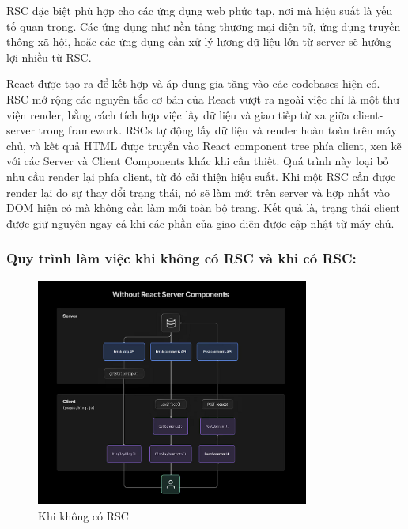 RSC đặc biệt phù hợp cho các ứng dụng web phức tạp, nơi mà hiệu suất là yếu tố quan trọng. Các ứng dụng như nền tảng thương mại điện tử, ứng dụng truyền thông xã hội, hoặc các ứng dụng cần xử lý lượng dữ liệu lớn từ server sẽ hưởng lợi nhiều từ RSC.

React được tạo ra để kết hợp và áp dụng gia tăng vào các codebases hiện có. RSC mở rộng các nguyên tắc cơ bản của React vượt ra ngoài việc chỉ là một thư viện render, bằng cách tích hợp việc lấy dữ liệu và giao tiếp từ xa giữa client-server trong framework. RSCs tự động lấy dữ liệu và render hoàn toàn trên máy chủ, và kết quả HTML được truyền vào React component tree phía client, xen kẽ với các Server và Client Components khác khi cần thiết. Quá trình này loại bỏ nhu cầu render lại phía client, từ đó cải thiện hiệu suất. Khi một RSC cần được render lại do sự thay đổi trạng thái, nó sẽ làm mới trên server và hợp nhất vào DOM hiện có mà không cần làm mới toàn bộ trang. Kết quả là, trạng thái client được giữ nguyên ngay cả khi các phần của giao diện được cập nhật từ máy chủ.

\subsubsection{Quy trình làm việc khi không có RSC và khi có RSC:}

\begin{figure}[H]
    \centering
    \includegraphics[width=0.8\textwidth]{img/withoutRSCs.png}
    \vspace{0.5cm}
    \caption{Khi không có RSC}
\end{figure}

